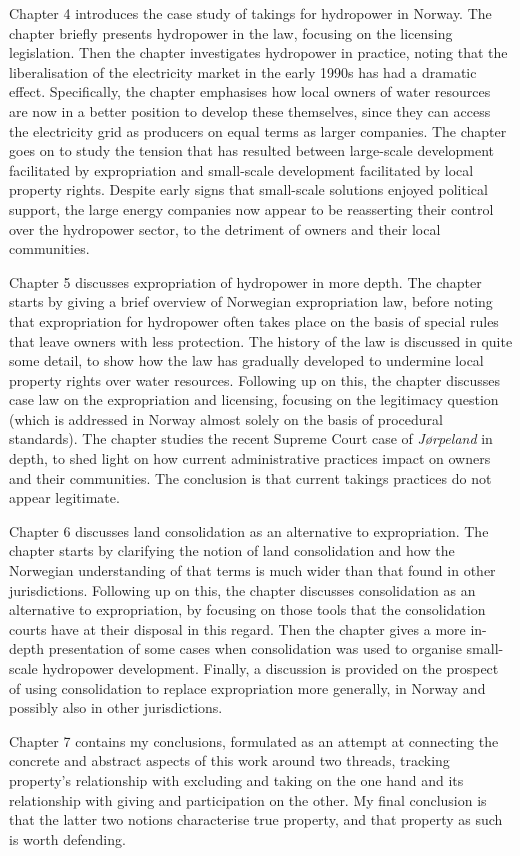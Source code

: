 {{Chapter 4 introduces the case study of takings for hydropower in Norway. The chapter briefly presents hydropower in the law, focusing on the licensing legislation. Then the chapter investigates hydropower in practice, noting that the liberalisation of the electricity market in the early 1990s has had a dramatic effect. Specifically, the chapter emphasises how local owners of water resources are now in a better position to develop these themselves, since they can access the electricity grid as producers on equal terms as larger companies. The chapter goes on to study the tension that has resulted between large-scale development facilitated by expropriation and small-scale development facilitated by local property rights. Despite early signs that small-scale solutions enjoyed political support, the large energy companies now appear to be reasserting their control over the hydropower sector, to the detriment of owners and their local communities.

Chapter 5 discusses expropriation of hydropower in more depth. The chapter starts by giving a brief overview of Norwegian expropriation law, before noting that expropriation for hydropower often takes place on the basis of special rules that leave owners with less protection. The history of the law is discussed in quite some detail, to show how the law has gradually developed to undermine local property rights over water resources. Following up on this, the chapter discusses case law on the expropriation and licensing, focusing on the legitimacy question (which is addressed in Norway almost solely on the basis of procedural standards). The chapter studies the recent Supreme Court case of {\it Jørpeland} in depth, to shed light on how current administrative practices impact on owners and their communities. The conclusion is that current takings practices do not appear legitimate.

Chapter 6 discusses land consolidation as an alternative to expropriation. The chapter starts by clarifying the notion of land consolidation and how the Norwegian understanding of that terms is much wider than that found in other jurisdictions. Following up on this, the chapter discusses consolidation as an alternative to expropriation, by focusing on those tools that the consolidation courts have at their disposal in this regard. Then the chapter gives a more in-depth presentation of some cases when consolidation was used to organise small-scale hydropower development. Finally, a discussion is provided on the prospect of using consolidation to replace expropriation more generally, in Norway and possibly also in other jurisdictions.

Chapter 7 contains my conclusions, formulated as an attempt at connecting the concrete and abstract aspects of this work around two threads, tracking property's relationship with excluding and taking on the one hand and its relationship with giving and participation on the other. My final conclusion is that the latter two notions characterise true property, and that property as such is worth defending.

} 
}